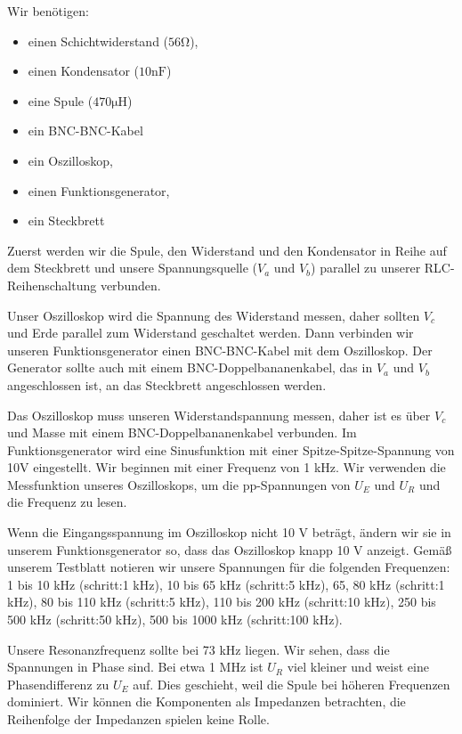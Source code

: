 Wir benötigen: 
\begin{itemize}
    \item einen Schichtwiderstand ($56\si{\ohm}$), 
    \item einen Kondensator ($10\si{\nano\farad}$)
    \item eine Spule ($470\si{\micro\henry}$) 
    \item ein BNC-BNC-Kabel
    \item ein Oszilloskop, 
    \item einen Funktionsgenerator, 
    \item ein Steckbrett
\end{itemize}


\par Zuerst werden wir die Spule, den Widerstand und den Kondensator in Reihe auf dem Steckbrett und unsere Spannungsquelle ($V_a$ und $V_b$) parallel zu unserer RLC-Reihenschaltung verbunden.
\par Unser Oszilloskop wird die Spannung des Widerstand messen, daher sollten $V_c$ und Erde parallel zum Widerstand geschaltet werden. Dann verbinden wir unseren Funktionsgenerator einen BNC-BNC-Kabel mit dem Oszilloskop. Der Generator sollte auch mit einem BNC-Doppelbananenkabel, das in $V_a$ und $V_b$ angeschlossen ist, an das Steckbrett angeschlossen werden.
\par Das Oszilloskop muss unseren Widerstandspannung messen, daher ist es über $V_c$ und Masse mit einem BNC-Doppelbananenkabel verbunden. Im Funktionsgenerator wird eine Sinusfunktion mit einer Spitze-Spitze-Spannung von 10V eingestellt. Wir beginnen mit einer Frequenz von 1 kHz.
Wir verwenden die Messfunktion unseres Oszilloskops, um die pp-Spannungen von $U_E$ und $U_R$ und die Frequenz zu lesen. \par Wenn die Eingangsspannung im Oszilloskop nicht 10 V beträgt, ändern wir sie in unserem Funktionsgenerator so, dass das Oszilloskop knapp 10 V anzeigt. Gemäß unserem Testblatt notieren wir unsere Spannungen für die folgenden Frequenzen: 1 bis 10 kHz (schritt:1 kHz), 10 bis 65 kHz (schritt:5 kHz), 65, 80 kHz (schritt:1 kHz), 80 bis 110 kHz (schritt:5 kHz),  110 bis 200 kHz (schritt:10 kHz), 250 bis 500 kHz (schritt:50 kHz), 500 bis 1000 kHz (schritt:100 kHz).  
\par Unsere Resonanzfrequenz sollte bei 73 kHz liegen. Wir sehen, dass die Spannungen in Phase sind. Bei etwa 1 MHz ist $U_R$ viel kleiner und weist eine Phasendifferenz zu $U_E$ auf. Dies geschieht, weil die Spule bei höheren Frequenzen dominiert.
%
Wir können die Komponenten als Impedanzen betrachten, die Reihenfolge der Impedanzen spielen keine Rolle.
%
%
\begin{flushright}
  \textit{\autorA}
\end{flushright}
%
%
%
%
